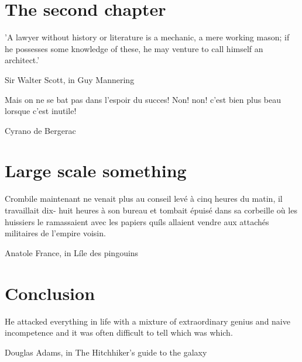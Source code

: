 \documentclass{ucbthesis}
\begin{document}
\chapter{The second chapter}
\epigraph{'A lawyer without history or literature is a mechanic, a mere working mason; if he possesses some knowledge of these, he may venture to call himself an architect.'}{Sir Walter Scott, in Guy Mannering}




\epigraph{Mais on ne se bat pas dans l'espoir du succes! Non! non! c'est bien plus beau lorsque c'est inutile!}{Cyrano de Bergerac}




% 

\chapter{Large scale something}
\epigraph{Crombile maintenant ne venait plus au conseil\; levé à cinq heures du matin, 
il travaillait dix- huit heures à son bureau et tombait épuisé dans sa corbeille où les huissiers 
le ramassaient avec les papiers qu\'ils allaient vendre 
aux attachés militaires de l'empire voisin.}{Anatole France, in L\'ile des pingouins}







\chapter{Conclusion}
\epigraph{He attacked everything in life with a mixture of extraordinary genius and naive incompetence and it was often difficult to tell which was which.}{Douglas Adams, in The Hitchhiker's guide to the galaxy}

\printbibliography
\end{document}
